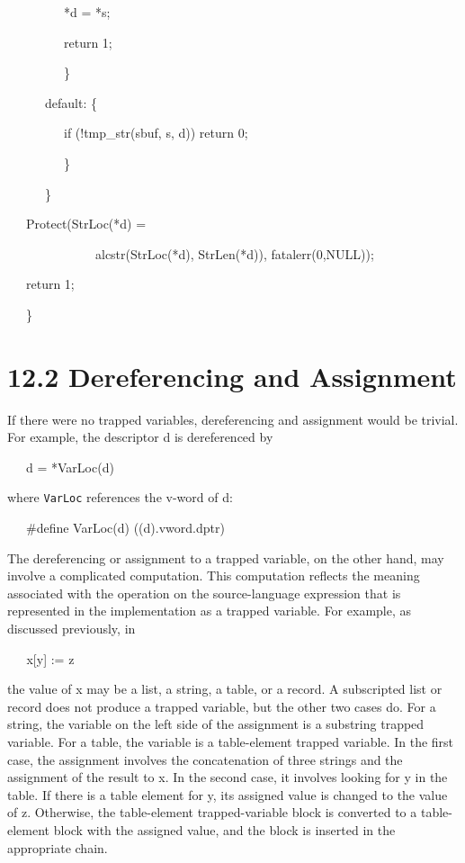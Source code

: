 {\ttfamily\mdseries
\ \ \ \ \ \ \ \ \ *d = *s;}

{\ttfamily\mdseries
\ \ \ \ \ \ \ \ \ return 1;}

{\ttfamily\mdseries
\ \ \ \ \ \ \ \ \ \}}

{\ttfamily\mdseries
\ \ \ \ \ \ default: \{}

{\ttfamily\mdseries
\ \ \ \ \ \ \ \ \ if (!tmp\_str(sbuf, s, d)) return 0;}

{\ttfamily\mdseries
\ \ \ \ \ \ \ \ \ \}}

{\ttfamily\mdseries
\ \ \ \ \ \ \}}

{\ttfamily\mdseries
\ \ \ Protect(StrLoc(*d) =}

{\ttfamily\mdseries
\ \ \ \ \ \ \ \ \ \ \ \ \ \ alcstr(StrLoc(*d), StrLen(*d)), fatalerr(0,NULL));}

{\ttfamily\mdseries
\ \ \ return 1;}

{\ttfamily\mdseries
\ \ \ \}}


\section[12.2 Dereferencing and Assignment]{12.2 Dereferencing and Assignment}

If there were no trapped variables, dereferencing and assignment would
be trivial. For example, the descriptor d is dereferenced by

{\ttfamily\mdseries
\ \ \ d = *VarLoc(d)}

\noindent where \texttt{VarLoc} references the v-word of d:

{\ttfamily\mdseries
\ \ \ \#define VarLoc(d) ((d).vword.dptr)}

The dereferencing or assignment to a trapped variable, on the other
hand, may involve a complicated computation. This computation reflects
the meaning associated with the operation on the source-language
expression that is represented in the implementation as a trapped
variable. For example, as discussed previously, in

{\ttfamily\mdseries
\textit{\ \ \ }x[y] := z}

\noindent the value of x may be a list, a string, a table, or a
record. A subscripted list or record does not produce a trapped
variable, but the other two cases do. For a string, the variable on
the left side of the assignment is a substring trapped variable. For a
table, the variable is a table-element trapped variable. In the first
case, the assignment involves the concatenation of three strings and
the assignment of the result to x. In the second case, it involves
looking for y in the table. If there is a table element for y, its
assigned value is changed to the value of z.  Otherwise, the
table-element trapped-variable block is converted to a table-element
block with the assigned value, and the block is inserted in the
appropriate chain.

